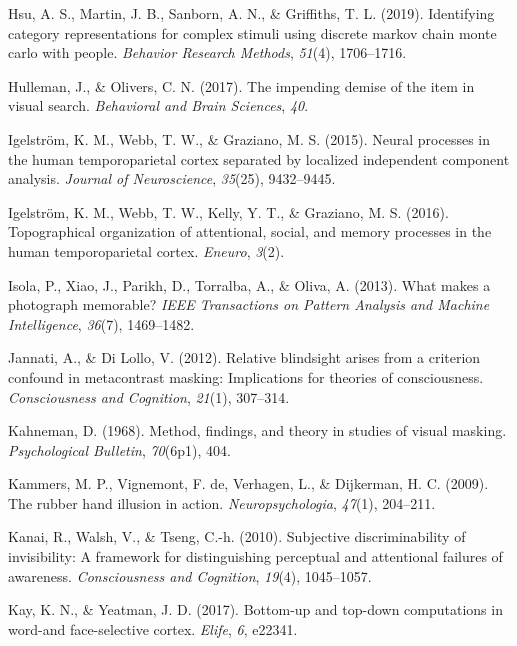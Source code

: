 \documentclass[12pt,twoside]{reedthesis}
\begin{document}
\leavevmode\hypertarget{ref-hsu2019identifying}{}%
Hsu, A. S., Martin, J. B., Sanborn, A. N., \& Griffiths, T. L. (2019). Identifying category representations for complex stimuli using discrete markov chain monte carlo with people. \emph{Behavior Research Methods}, \emph{51}(4), 1706--1716.

\leavevmode\hypertarget{ref-hulleman2017impending}{}%
Hulleman, J., \& Olivers, C. N. (2017). The impending demise of the item in visual search. \emph{Behavioral and Brain Sciences}, \emph{40}.

\leavevmode\hypertarget{ref-igelstrom2015neural}{}%
Igelström, K. M., Webb, T. W., \& Graziano, M. S. (2015). Neural processes in the human temporoparietal cortex separated by localized independent component analysis. \emph{Journal of Neuroscience}, \emph{35}(25), 9432--9445.

\leavevmode\hypertarget{ref-igelstrom2016topographical}{}%
Igelström, K. M., Webb, T. W., Kelly, Y. T., \& Graziano, M. S. (2016). Topographical organization of attentional, social, and memory processes in the human temporoparietal cortex. \emph{Eneuro}, \emph{3}(2).

\leavevmode\hypertarget{ref-isola2013makes}{}%
Isola, P., Xiao, J., Parikh, D., Torralba, A., \& Oliva, A. (2013). What makes a photograph memorable? \emph{IEEE Transactions on Pattern Analysis and Machine Intelligence}, \emph{36}(7), 1469--1482.

\leavevmode\hypertarget{ref-jannati2012relative}{}%
Jannati, A., \& Di Lollo, V. (2012). Relative blindsight arises from a criterion confound in metacontrast masking: Implications for theories of consciousness. \emph{Consciousness and Cognition}, \emph{21}(1), 307--314.

\leavevmode\hypertarget{ref-kahneman1968method}{}%
Kahneman, D. (1968). Method, findings, and theory in studies of visual masking. \emph{Psychological Bulletin}, \emph{70}(6p1), 404.

\leavevmode\hypertarget{ref-kammers2009rubber}{}%
Kammers, M. P., Vignemont, F. de, Verhagen, L., \& Dijkerman, H. C. (2009). The rubber hand illusion in action. \emph{Neuropsychologia}, \emph{47}(1), 204--211.

\leavevmode\hypertarget{ref-kanai2010subjective}{}%
Kanai, R., Walsh, V., \& Tseng, C.-h. (2010). Subjective discriminability of invisibility: A framework for distinguishing perceptual and attentional failures of awareness. \emph{Consciousness and Cognition}, \emph{19}(4), 1045--1057.

\leavevmode\hypertarget{ref-kay2017bottom}{}%
Kay, K. N., \& Yeatman, J. D. (2017). Bottom-up and top-down computations in word-and face-selective cortex. \emph{Elife}, \emph{6}, e22341.
\end{document}
